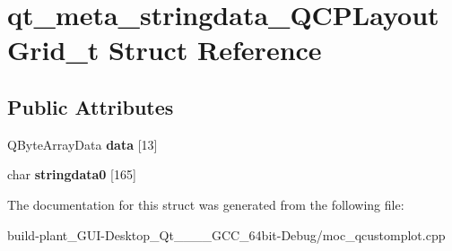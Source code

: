 \hypertarget{structqt__meta__stringdata__QCPLayoutGrid__t}{}\section{qt\+\_\+meta\+\_\+stringdata\+\_\+\+Q\+C\+P\+Layout\+Grid\+\_\+t Struct Reference}
\label{structqt__meta__stringdata__QCPLayoutGrid__t}
\subsection*{Public Attributes}
\begin{DoxyCompactItemize}
\item 
\mbox{\label{structqt__meta__stringdata__QCPLayoutGrid__t_ab9a2518e0da08ddfb279fb649cdec091}} 
Q\+Byte\+Array\+Data {\bfseries data} \mbox{[}13\mbox{]}
\item 
\mbox{\label{structqt__meta__stringdata__QCPLayoutGrid__t_a0592c486ce0adf2a3a83670727f00df2}} 
char {\bfseries stringdata0} \mbox{[}165\mbox{]}
\end{DoxyCompactItemize}


The documentation for this struct was generated from the following file\+:\begin{DoxyCompactItemize}
\item 
build-\/plant\+\_\+\+G\+U\+I-\/\+Desktop\+\_\+\+Qt\+\_\+\_\+\_\+\_\+\+G\+C\+C\+\_\+64bit-\/\+Debug/moc\+\_\+qcustomplot.\+cpp\end{DoxyCompactItemize}
